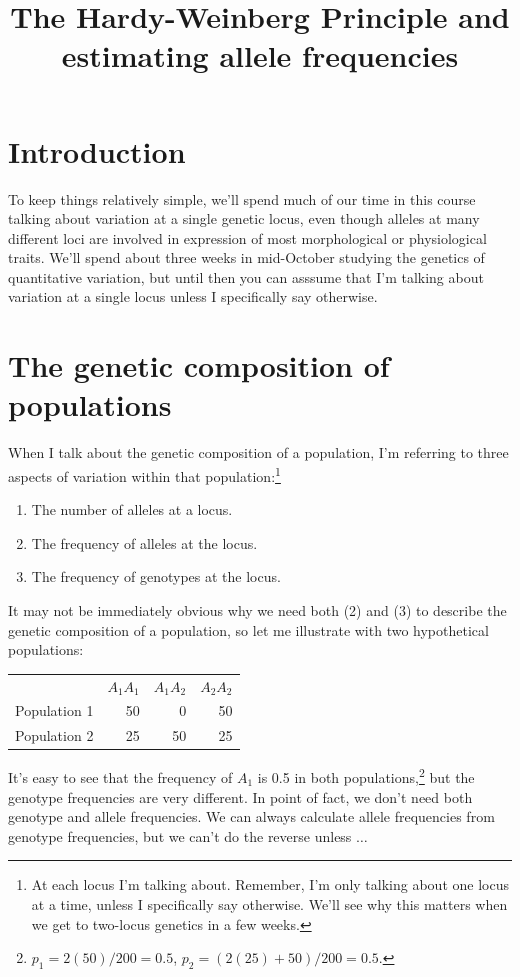 \documentclass[12pt]{article}
\title{The Hardy-Weinberg Principle and estimating allele frequencies}
\begin{document}
\maketitle

\thispagestyle{first}

\section*{Introduction}

To keep things relatively simple, we'll spend much of our time in this
course talking about variation at a single genetic locus, even though
alleles at many different loci are involved in expression of most
morphological or physiological traits. We'll spend about three weeks
in mid-October studying the genetics of quantitative variation, but
until then you can asssume that I'm talking about variation at a
single locus unless I specifically say otherwise.

\section*{The genetic composition of populations}

When I talk about the genetic composition of a population, I'm
referring to three aspects of variation within that
population:\footnote{At each locus I'm talking about. Remember, I'm
  only talking about one locus at a time, unless I specifically say
  otherwise. We'll see why this matters when we get to two-locus
  genetics in a few weeks.}
\begin{enumerate}

\item The number of alleles at a locus.

\item The frequency of alleles at the locus.

\item The frequency of genotypes at the locus.

\end{enumerate}
It may not be immediately obvious why we need both (2) and
(3) to describe the genetic composition of a population, so let me
illustrate with two hypothetical populations:
\begin{center}
\begin{tabular}{lrrr}
             & $A_1A_1$ & $A_1A_2$ & $A_2A_2$ \\
Population 1 &       50 &        0 &       50 \\
Population 2 &       25 &       50 &       25 \\
\end{tabular}
\end{center}
It's easy to see that the frequency of $A_1$ is 0.5 in both
populations,\footnote{$p_1 = 2(50)/200 = 0.5$, $p_2 = (2(25) + 50)/200
= 0.5$.} but the genotype frequencies are very different. In point of
fact, we don't need both genotype and allele frequencies. We can
always calculate allele frequencies from genotype frequencies, but we
can't do the reverse unless $\dots$
\end{document}
